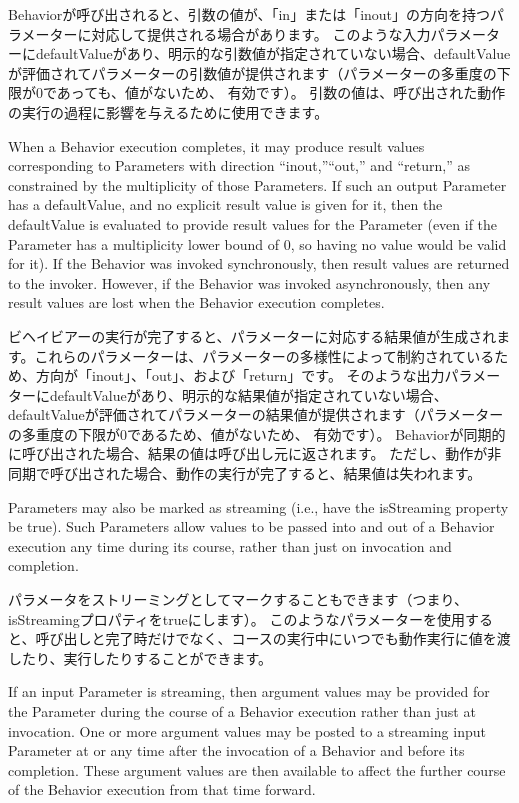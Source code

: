 \documentclass[a4paper,11pt]{ltjsarticle}
\begin{document}
Behaviorが呼び出されると、引数の値が、「in」または「inout」の方向を持つパラメーターに対応して提供される場合があります。
このような入力パラメーターにdefaultValueがあり、明示的な引数値が指定されていない場合、defaultValueが評価されてパラメーターの引数値が提供されます（パラメーターの多重度の下限が0であっても、値がないため、 有効です）。 引数の値は、呼び出された動作の実行の過程に影響を与えるために使用できます。


When a Behavior execution completes, it may produce result values corresponding to Parameters with direction “inout,”“out,” and “return,” as constrained by the multiplicity of those Parameters. 
If such an output Parameter has a defaultValue, and no explicit result value is given for it, then the defaultValue is evaluated to provide result values for the Parameter (even if the Parameter has a multiplicity lower bound of 0, so having no value would be valid for it). 
If the Behavior was invoked synchronously, then result values are returned to the invoker. 
However, if the Behavior was invoked asynchronously, then any result values are lost when the Behavior execution completes.

ビヘイビアーの実行が完了すると、パラメーターに対応する結果値が生成されます。これらのパラメーターは、パラメーターの多様性によって制約されているため、方向が「inout」、「out」、および「return」です。
そのような出力パラメーターにdefaultValueがあり、明示的な結果値が指定されていない場合、defaultValueが評価されてパラメーターの結果値が提供されます（パラメーターの多重度の下限が0であるため、値がないため、 有効です）。
Behaviorが同期的に呼び出された場合、結果の値は呼び出し元に返されます。
ただし、動作が非同期で呼び出された場合、動作の実行が完了すると、結果値は失われます。

Parameters may also be marked as streaming (i.e., have the isStreaming property be true). 
Such Parameters allow values to be passed into and out of a Behavior execution any time during its course, rather than just on invocation and completion.

パラメータをストリーミングとしてマークすることもできます（つまり、isStreamingプロパティをtrueにします）。
このようなパラメーターを使用すると、呼び出しと完了時だけでなく、コースの実行中にいつでも動作実行に値を渡したり、実行したりすることができます。

If an input Parameter is streaming, then argument values may be provided for the Parameter during the course of a Behavior execution rather than just at invocation. 
One or more argument values may be posted to a streaming input Parameter at or any time after the invocation of a Behavior and before its completion. 
These argument values are then available to affect the further course of the Behavior execution from that time forward.
\end{document}
